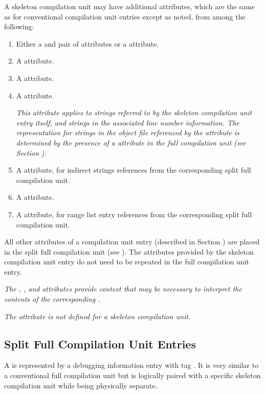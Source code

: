 A skeleton compilation unit may have additional attributes, 
which are the same as for conventional compilation unit entries 
except as noted, from among the following:
\begin{enumerate}[1. ]
\addtocounter{enumi}{1}
\item Either a \DWATlowpc{} and \DWAThighpc{} pair of attributes
or a \DWATranges{} attribute.
\item A \DWATstmtlist{} attribute.
\item A \DWATcompdir{} attribute.

\item A \DWATuseUTFeight{} attribute.

\textit{This attribute applies to strings referred to by the skeleton
compilation unit entry itself, and strings in the associated line
number information.
The representation for strings in the object file referenced 
by the \DWATdwoname{} attribute is determined by the presence 
of a \DWATuseUTFeight{} attribute in the full compilation unit 
(see Section ).}

\item A 
\bb
\DWATstroffsets{} 
\eb
attribute, for indirect strings references from the 
\bb
corresponding split full
\eb 
compilation unit.

\item A \DWATaddrbase{} attribute.

\bb
\item A \DWATrnglistsbase{} attribute, for range list entry references 
from the corresponding split full compilation unit.
\eb

\end{enumerate}

All other attributes of a compilation unit entry (described
in Section )
are placed in the split full compilation unit
(see ).
The attributes provided by the skeleton compilation
unit entry do not need to be repeated in the full compilation
unit entry.

\textit{The \DWATaddrbase{},
\bb 
\DWATstroffsets{}, and \DWATrnglistsbase{}
\eb
attributes provide context that may be 
necessary to interpret the contents
of the corresponding \splitDWARFobjectfile.}

\textit{The \DWATbasetypes{} attribute is not defined for a
skeleton compilation unit.}


\subsection{Split Full Compilation Unit Entries}
\label{chap:splitfullcompilationunitentries}
A  is represented by a 
debugging information entry with tag \DWTAGcompileunit.
It is very similar to a conventional full compilation unit but
is logically paired with a specific skeleton compilation unit while
being physically separate.


